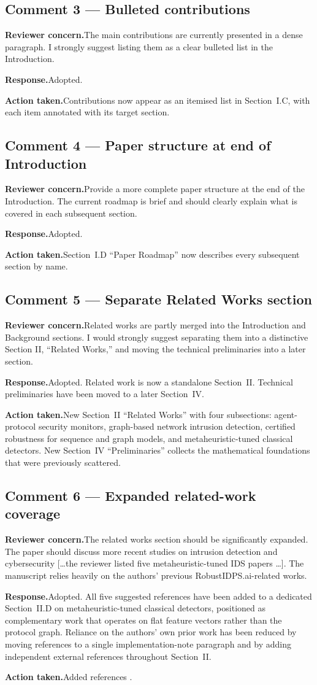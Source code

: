 \documentclass[11pt,a4paper]{article}
\newcommand{\concern}[1]{\noindent\textbf{Reviewer concern.}\quad #1\par\vspace{0.3em}}
\newcommand{\response}[1]{\noindent\textbf{Response.}\quad #1\par\vspace{0.3em}}
\newcommand{\action}[1]{\noindent\textbf{Action taken.}\quad #1\par\vspace{0.8em}}
\begin{document}
\subsection*{Comment 3 --- Bulleted contributions}
\concern{The main contributions are currently presented in a dense paragraph. I strongly suggest listing them as a clear bulleted list in the Introduction.}
\response{Adopted.}
\action{Contributions now appear as an itemised list in Section~I.C, with each item annotated with its target section.}

\subsection*{Comment 4 --- Paper structure at end of Introduction}
\concern{Provide a more complete paper structure at the end of the Introduction. The current roadmap is brief and should clearly explain what is covered in each subsequent section.}
\response{Adopted.}
\action{Section~I.D ``Paper Roadmap'' now describes every subsequent section by name.}

\subsection*{Comment 5 --- Separate Related Works section}
\concern{Related works are partly merged into the Introduction and Background sections. I would strongly suggest separating them into a distinctive Section II, ``Related Works,'' and moving the technical preliminaries into a later section.}
\response{Adopted. Related work is now a standalone Section~II. Technical preliminaries have been moved to a later Section~IV.}
\action{New Section~II ``Related Works'' with four subsections: agent-protocol security monitors, graph-based network intrusion detection, certified robustness for sequence and graph models, and metaheuristic-tuned classical detectors. New Section~IV ``Preliminaries'' collects the mathematical foundations that were previously scattered.}

\subsection*{Comment 6 --- Expanded related-work coverage}
\concern{The related works section should be significantly expanded. The paper should discuss more recent studies on intrusion detection and cybersecurity [\dots the reviewer listed five metaheuristic-tuned IDS papers \dots]. The manuscript relies heavily on the authors' previous RobustIDPS.ai-related works.}
\response{Adopted. All five suggested references have been added to a dedicated Section~II.D on metaheuristic-tuned classical detectors, positioned as complementary work that operates on flat feature vectors rather than the protocol graph. Reliance on the authors' own prior work has been reduced by moving references to a single implementation-note paragraph and by adding independent external references throughout Section~II.}
\action{Added references \cite{Salb2023SCACloud,Bacanin2024MetaverseIDS,Zivkovic2023IoTSoftware,Zivkovic2023CatBoostReptile,Zivkovic2022BoostingSmartCity}.}
\end{document}
